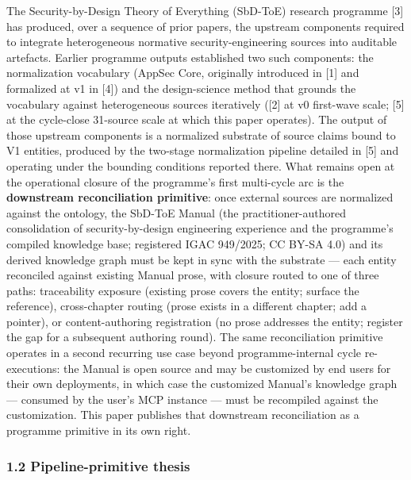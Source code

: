 \documentclass[
]{article}
\begin{document}
The Security-by-Design Theory of Everything (SbD-ToE) research programme
{[}3{]} has produced, over a sequence of prior papers, the upstream
components required to integrate heterogeneous normative
security-engineering sources into auditable artefacts. Earlier programme
outputs established two such components: the normalization vocabulary
(AppSec Core, originally introduced in {[}1{]} and formalized at v1 in
{[}4{]}) and the design-science method that grounds the vocabulary
against heterogeneous sources iteratively ({[}2{]} at v0 first-wave
scale; {[}5{]} at the cycle-close 31-source scale at which this paper
operates). The output of those upstream components is a normalized
substrate of source claims bound to V1 entities, produced by the
two-stage normalization pipeline detailed in {[}5{]} and operating under
the bounding conditions reported there. What remains open at the
operational closure of the programme's first multi-cycle arc is the
\textbf{downstream reconciliation primitive}: once external sources are
normalized against the ontology, the SbD-ToE Manual (the
practitioner-authored consolidation of security-by-design engineering
experience and the programme's compiled knowledge base; registered IGAC
949/2025; CC BY-SA 4.0) and its derived knowledge graph must be kept in
sync with the substrate --- each entity reconciled against existing
Manual prose, with closure routed to one of three paths: traceability
exposure (existing prose covers the entity; surface the reference),
cross-chapter routing (prose exists in a different chapter; add a
pointer), or content-authoring registration (no prose addresses the
entity; register the gap for a subsequent authoring round). The same
reconciliation primitive operates in a second recurring use case beyond
programme-internal cycle re-executions: the Manual is open source and
may be customized by end users for their own deployments, in which case
the customized Manual's knowledge graph --- consumed by the user's MCP
instance --- must be recompiled against the customization. This paper
publishes that downstream reconciliation as a programme primitive in its
own right.

\subsubsection{1.2 Pipeline-primitive
thesis}\label{pipeline-primitive-thesis}
\end{document}
